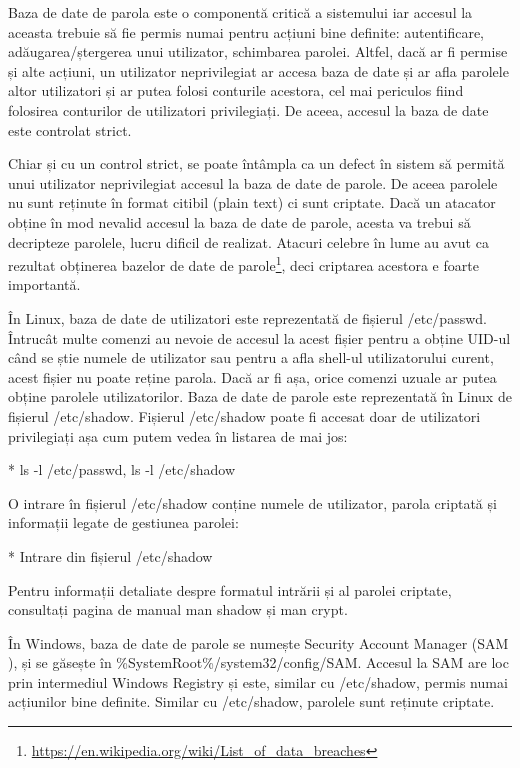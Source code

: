 Baza de date de parola este o componentă critică a sistemului iar accesul la
aceasta trebuie să fie permis numai pentru acțiuni bine definite: autentificare,
adăugarea/ștergerea unui utilizator, schimbarea parolei. Altfel, dacă ar fi
permise și alte acțiuni, un utilizator neprivilegiat ar accesa baza de date și
ar afla parolele altor utilizatori și ar putea folosi conturile acestora, cel
mai periculos fiind folosirea conturilor de utilizatori privilegiați. De aceea,
accesul la baza de date este controlat strict.

Chiar și cu un control strict, se poate întâmpla ca un defect în sistem să
permită unui utilizator neprivilegiat accesul la baza de date de parole. De
aceea parolele nu sunt reținute în format citibil (plain text) ci sunt criptate.
Dacă un atacator obține în mod nevalid accesul la baza de date de parole, acesta
va trebui să decripteze parolele, lucru dificil de realizat. Atacuri celebre în
lume au avut ca rezultat obținerea bazelor de date de
parole\footnote{\url{https://en.wikipedia.org/wiki/List_of_data_breaches}}, deci
criptarea acestora e foarte importantă.

În Linux, baza de date de utilizatori este reprezentată de fișierul /etc/passwd.
Întrucât multe comenzi au nevoie de accesul la acest fișier pentru a obține
UID-ul când se știe numele de utilizator sau pentru a afla shell-ul
utilizatorului curent, acest fișier nu poate reține parola. Dacă ar fi așa,
orice comenzi uzuale ar putea obține parolele utilizatorilor. Baza de date de
parole este reprezentată în Linux de fișierul /etc/shadow. Fișierul /etc/shadow
poate fi accesat doar de utilizatori privilegiați așa cum putem vedea în
listarea de mai jos:

* ls -l /etc/passwd, ls -l /etc/shadow

O intrare în fișierul /etc/shadow conține numele de utilizator, parola criptată
și informații legate de gestiunea parolei:

* Intrare din fișierul /etc/shadow

Pentru informații detaliate despre formatul intrării și al parolei criptate,
consultați pagina de manual man shadow și man crypt.

În Windows, baza de date de parole se numește Security Account Manager (SAM
), și se găsește în
\%SystemRoot\%/system32/config/SAM. Accesul la SAM are loc prin intermediul
Windows Registry și este, similar cu /etc/shadow, permis numai acțiunilor bine
definite. Similar cu /etc/shadow, parolele sunt reținute criptate.

